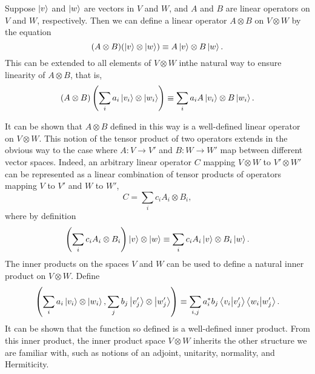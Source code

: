 Suppose $\ket{v}$ and $\ket{w}$ are vectors in $V$ and $W$, and $A$ and $B$ are
linear operators on $V$ and $W$, respectively. Then we can define a linear
operator $A \otimes B$ on $V \otimes W$ by the equation \begin{equation*}
  (A \otimes B)(\ket{v} \otimes \ket{w}) \equiv A\ket{v} \otimes B\ket{w}.
\end{equation*}
This can be extended to all elements of $V \otimes W$ inthe natural way to
ensure linearity of $A \otimes B$, that is, \begin{equation*}
  (A \otimes B)\left(\sum_i a_i\ket{v_i} \otimes \ket{w_i}\right)
  \equiv \sum_i a_iA\ket{v_i} \otimes B\ket{w_i}.
\end{equation*}

It can be shown that $A \otimes B$ defined in this way is a well-defined linear
operator on $V \otimes W$. This notion of the tensor product of two operators
extends in the obvious way to the case where $A: V \rightarrow V'$ and $B: W
\rightarrow W'$ map between different vector spaces. Indeed, an arbitrary
linear operator $C$ mapping $V \otimes W$ to $V' \otimes W'$ can be represented
as a linear combination of tensor products of operators mapping $V$ to $V'$ and
$W$ to $W'$, \begin{equation*}
  C = \sum_i c_iA_i \otimes B_i,
\end{equation*}
where by definition \begin{equation*}
  \left(\sum_i c_iA_i \otimes B_i\right) \ket{v} \otimes \ket{w}
  \equiv \sum_i c_iA_i\ket{v} \otimes B_i\ket{w}.
\end{equation*}
The inner products on the spaces $V$ and $W$ can be used to define a natural
inner product on $V \otimes W$. Define \begin{equation*}
  \left(\sum_i a_i\ket{v_i} \otimes \ket{w_i}, \sum_j b_j\ket{v'_j} \otimes
  \ket{w'_j}\right) \equiv \sum_{i,j} a_i^*b_j \braket{v_i}{v'_j}
  \braket{w_i}{w'_j}.
\end{equation*}
It can be shown that the function so defined is a well-defined inner product.
From this inner product, the inner product space $V \otimes W$ inherits the
other structure we are familiar with, such as notions of an adjoint, unitarity,
normality, and Hermiticity.

